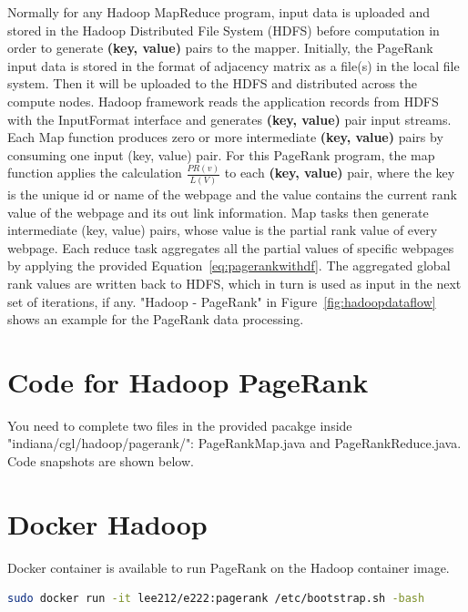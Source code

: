 Normally for any Hadoop MapReduce program, input data is uploaded and stored in
the Hadoop Distributed File System (HDFS) before computation in order to
generate \textbf{(key, value)} pairs to the mapper. Initially, the PageRank
input data is stored in the format of adjacency matrix as a file(s) in the
local file system. Then it will be uploaded to the HDFS and distributed across
the compute nodes. Hadoop framework reads the application records from HDFS
with the InputFormat interface and generates \textbf{(key, value)} pair input
streams. Each Map function produces zero or more intermediate \textbf{(key,
value)} pairs by consuming one input (key, value) pair. For this PageRank
program, the map function applies the calculation $\frac{PR(v)}{L(V)}$ to each
\textbf{(key, value)} pair, where the key is the unique id or name of the
webpage and the value contains the current rank value of the webpage and its
out link information. Map tasks then generate intermediate (key, value) pairs,
whose value is the partial rank value of every webpage. Each reduce task
aggregates all the partial values of specific webpages by applying the provided
Equation~\ref{eq:pagerankwithdf}. The aggregated global rank values are written
back to HDFS, which in turn is used as input in the next set of iterations, if
any. "Hadoop - PageRank" in Figure~\ref{fig:hadoopdataflow} shows an example
for the PageRank data processing.


\section*{Code for Hadoop PageRank}

You need to complete two files in the provided pacakge inside
"indiana/cgl/hadoop/pagerank/": PageRankMap.java and PageRankReduce.java. Code
snapshots are shown below.




\section{Docker Hadoop}
Docker container is available to run PageRank on the Hadoop container image.

\begin{lstlisting}[language=bash]
sudo docker run -it lee212/e222:pagerank /etc/bootstrap.sh -bash
\end{lstlisting}

